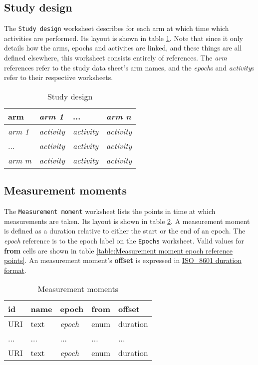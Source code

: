 \documentclass[a4paper,10pt]{article}
\begin{document}
\subsection{Study design}
The \texttt{Study design} worksheet describes for each arm at which time which activities are performed. Its layout is shown in table \ref{table:Study design}. Note that since it only details how the arms, epochs and activites are linked, and these things are all defined elsewhere, this worksheet consists entirely of references. The \textit{arm} references refer to the study data sheet's arm names, and the \textit{epoch}s and \textit{activity}s refer to their respective worksheets.

\begin{table}[!h]
  \centering
  \caption{Study design}
  \label{table:Study design}
  \begin{tabular}{|l|l|l|l|}
    \hline
    \textbf{arm}   & \textit{arm 1}    & ...               & \textit{arm n}    \\ \hline
    \textit{arm 1} & \textit{activity} & \textit{activity} & \textit{activity} \\ \hline
    ...            & \textit{activity} & \textit{activity} & \textit{activity} \\ \hline
    \textit{arm m} & \textit{activity} & \textit{activity} & \textit{activity} \\ \hline
  \end{tabular}
\end{table}

\subsection{Measurement moments}
The \texttt{Measurement moment} worksheet lists the points in time at which measurements are taken. Its layout is shown in table \ref{table:Measurement moments}. A measurement moment is defined as a duration relative to either the start or the end of an epoch. The \textit{epoch} reference is to the epoch label on the \texttt{Epochs} worksheet. Valid values for \textbf{from} cells are shown in table \ref{table:Measurement moment epoch reference points}. An measurement moment's \textbf{offset} is expressed in \href{https://en.wikipedia.org/wiki/ISO_8601#Durations}{ISO\_8601 duration format}. 

\begin{table}[!h]
  \centering
  \caption{Measurement moments}
  \label{table:Measurement moments}
  \begin{tabular}{|l|l|l|l|l|}
    \hline
    \textbf{id} & \textbf{name} & \textbf{epoch} & \textbf{from} & \textbf{offset} \\ \hline
    URI         & text          & \textit{epoch} & enum     & duration        \\ \hline
    ...         & ...           & ...            &  ...          & ...             \\ \hline
    URI         & text          & \textit{epoch} & enum     & duration        \\ \hline
  \end{tabular}
\end{table}
\end{document}
